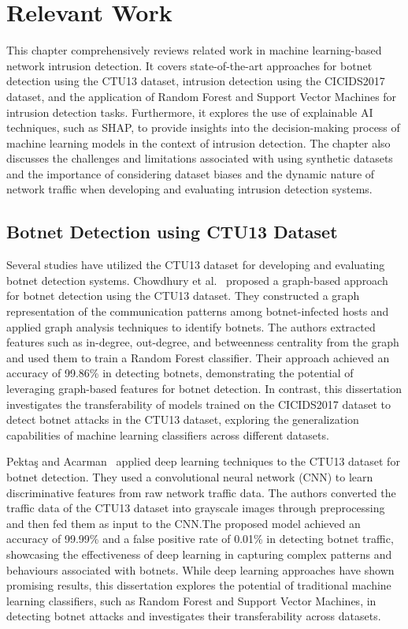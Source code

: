 \chapter{Relevant Work}\label{chap:relevant-work}

This chapter comprehensively reviews related work in machine learning-based network intrusion detection. It covers state-of-the-art approaches for botnet detection using the CTU13 dataset, intrusion detection using the CICIDS2017 dataset, and the application of Random Forest and Support Vector Machines for intrusion detection tasks. Furthermore, it explores the use of explainable AI techniques, such as SHAP, to provide insights into the decision-making process of machine learning models in the context of intrusion detection. The chapter also discusses the challenges and limitations associated with using synthetic datasets and the importance of considering dataset biases and the dynamic nature of network traffic when developing and evaluating intrusion detection systems.

\section{Botnet Detection using CTU13 Dataset}

Several studies have utilized the CTU13 dataset for developing and evaluating botnet detection systems. Chowdhury et al.~\cite{chowdhury2017botnet} proposed a graph-based approach for botnet detection using the CTU13 dataset. They constructed a graph representation of the communication patterns among botnet-infected hosts and applied graph analysis techniques to identify botnets. The authors extracted features such as in-degree, out-degree, and betweenness centrality from the graph and used them to train a Random Forest classifier. Their approach achieved an accuracy of 99.86\% in detecting botnets, demonstrating the potential of leveraging graph-based features for botnet detection. In contrast, this dissertation investigates the transferability of models trained on the CICIDS2017 dataset to detect botnet attacks in the CTU13 dataset, exploring the generalization capabilities of machine learning classifiers across different datasets.

Pektaş and Acarman~\cite{pektacs2019deep} applied deep learning techniques to the CTU13 dataset for botnet detection. They used a convolutional neural network (CNN) to learn discriminative features from raw network traffic data. The authors converted the traffic data of the CTU13 dataset into grayscale images through preprocessing and then fed them as input to the CNN.\@ The proposed model achieved an accuracy of 99.99\% and a false positive rate of 0.01\% in detecting botnet traffic, showcasing the effectiveness of deep learning in capturing complex patterns and behaviours associated with botnets. While deep learning approaches have shown promising results, this dissertation explores the potential of traditional machine learning classifiers, such as Random Forest and Support Vector Machines, in detecting botnet attacks and investigates their transferability across datasets.

